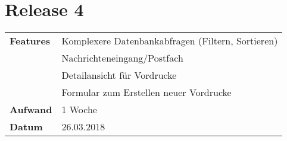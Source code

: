 \section*{Release 4}
\label{sec:release_4}

\begin{tabular}{p{5cm} p{9cm}}
    \textbf{Features} & Komplexere Datenbankabfragen (Filtern, Sortieren) \\
    & Nachrichteneingang/Postfach \\
    & Detailansicht für Vordrucke \\
    & Formular zum Erstellen neuer Vordrucke \\
    \hline
    \textbf{Aufwand} & 1 Woche \\
    \hline
    \textbf{Datum} & 26.03.2018
\end{tabular}
